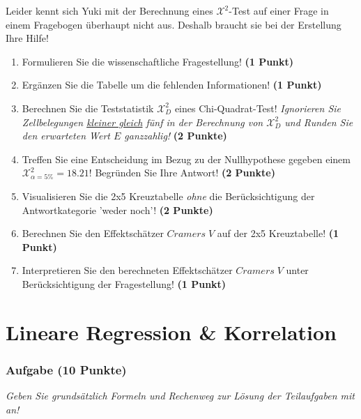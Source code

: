 \documentclass[a4paper, 9pt]{scrartcl}\usepackage[]{graphicx}\usepackage[]{xcolor}
\begin{document}
Leider kennt sich Yuki mit der Berechnung eines $\mathcal{X}^2$-Test auf einer Frage in einem Fragebogen überhaupt nicht aus. Deshalb braucht sie bei der Erstellung Ihre Hilfe!

\begin{enumerate}
\item Formulieren Sie die wissenschaftliche Fragestellung! \textbf{(1 Punkt)}
\item Ergänzen Sie die Tabelle um die fehlenden Informationen! \textbf{(1 Punkt)} 
\item Berechnen Sie die Teststatistik $\mathcal{X}^2_{D}$ eines Chi-Quadrat-Test! \textit{Ignorieren Sie Zellbelegungen \underline{kleiner gleich} fünf in der Berechnung von $\mathcal{X}^2_{D}$ und Runden Sie den erwarteten Wert $E$ ganzzahlig!} \textbf{(2 Punkte)}
\item Treffen Sie eine Entscheidung im Bezug zu der Nullhypothese gegeben
  einem $\mathcal{X}^2_{\alpha = 5\%} = 18.21$! Begründen Sie Ihre Antwort!
  \textbf{(2 Punkte)}
\item Visualisieren Sie die 2x5 Kreuztabelle \textit{ohne} die Berücksichtigung der Antwortkategorie 'weder noch'! \textbf{(2 Punkte)}
\item Berechnen Sie den Effektschätzer $Cramers\; V$ auf der 2x5 Kreuztabelle! \textbf{(1 Punkt)}
\item Interpretieren Sie den berechneten Effektschätzer $Cramers\; V$ unter Berücksichtigung der Fragestellung! \textbf{(1 Punkt)}
\end{enumerate} 
\clearpage
\part{Lineare Regression \& Korrelation}

\section{Aufgabe \hfill (10 Punkte)}

\textit{Geben Sie grundsätzlich Formeln und Rechenweg zur Lösung der Teilaufgaben mit an!} \\[1Ex]
 
\end{document}
